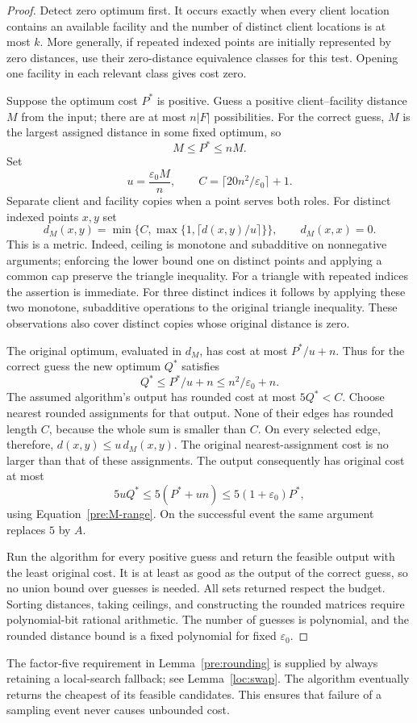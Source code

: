 \begin{proof}
Detect zero optimum first. It occurs exactly when every client location
contains an available facility and the number of distinct client
locations is at most $k$. More generally, if repeated indexed points
are initially represented by zero distances, use their zero-distance
equivalence classes for this test. Opening one facility in each relevant
class gives cost zero.

Suppose the optimum cost $P^*$ is positive. Guess a positive client--facility
distance $M$ from the input; there are at most $n|F|$ possibilities.
For the correct guess, $M$ is the largest assigned distance in some
fixed optimum, so
\begin{equation}\label{pre:M-range}
 M\le P^*\le nM.
\end{equation}
Set
\[
 u=\frac{\varepsilon_0M}{n},\qquad
 C=\lceil20n^2/\varepsilon_0\rceil+1.
\]
Separate client and facility copies when a point serves both roles.
For distinct indexed points $x,y$ set
\[
 d_M(x,y)=\min\{C,\max\{1,\lceil d(x,y)/u\rceil\}\},
 \qquad d_M(x,x)=0.
\]
This is a metric. Indeed, ceiling is monotone and subadditive on
nonnegative arguments; enforcing the lower bound one on distinct
points and applying a common cap preserve the triangle inequality.
For a triangle with repeated indices the assertion is immediate.
For three distinct indices it follows by applying these two monotone,
subadditive operations to the original triangle inequality. These
observations also cover distinct copies whose original distance is zero.

The original optimum, evaluated in $d_M$, has cost at most $P^*/u+n$.
Thus for the correct guess the new optimum $Q^*$ satisfies
\begin{equation}\label{pre:rounded-optimum}
 Q^*\le P^*/u+n\le n^2/\varepsilon_0+n.
\end{equation}
The assumed algorithm's output has rounded cost at most $5Q^*<C$.
Choose nearest rounded assignments for that output. None of their
edges has rounded length $C$, because the whole sum is smaller than
$C$. On every selected edge, therefore,
$d(x,y)\le u\,d_M(x,y)$. The original nearest-assignment cost is no
larger than that of these assignments. The output consequently has
original cost at most
\[
 5uQ^*\le5(P^*+un)\le5(1+\varepsilon_0)P^*,
\]
using Equation~\eqref{pre:M-range}. On the successful event the same
argument replaces $5$ by $A$.

Run the algorithm for every positive guess and return the feasible
output with the least original cost. It is at least as good as the
output of the correct guess, so no union bound over guesses is needed.
All sets returned respect the budget. Sorting distances, taking ceilings,
and constructing the rounded matrices require polynomial-bit rational
arithmetic. The number of guesses is polynomial, and the rounded
distance bound is a fixed polynomial for fixed $\varepsilon_0$.
\end{proof}

The factor-five requirement in Lemma~\ref{pre:rounding} is supplied by
always retaining a local-search fallback; see Lemma~\ref{loc:swap}.
The algorithm eventually returns the cheapest of its feasible candidates.
This ensures that failure of a sampling event never causes unbounded cost.
